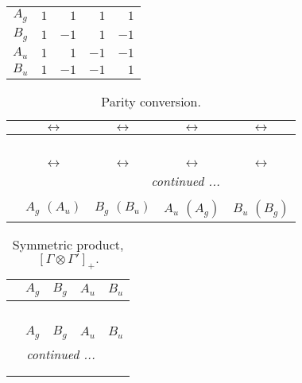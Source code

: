 \documentclass[fleqn,10pt,landscape]{article}
\begin{document}
\begin{itemize}
\begin{center}
\begin{longtable}{c|rrrr}
$ A_{g} $ & $ 1 $ & $ 1 $ & $ 1 $ & $ 1 $ \\
$ B_{g} $ & $ 1 $ & $ -1 $ & $ 1 $ & $ -1 $ \\
$ A_{u} $ & $ 1 $ & $ 1 $ & $ -1 $ & $ -1 $ \\
$ B_{u} $ & $ 1 $ & $ -1 $ & $ -1 $ & $ 1 $ \\
\end{longtable}
\end{center}
\begin{center}
\renewcommand{\arraystretch}{1.0}
\begin{longtable}{ccccc}
\caption{Parity conversion.}
 \\
 \hline \hline
 & $\leftrightarrow$ & $\leftrightarrow$ & $\leftrightarrow$ & $\leftrightarrow$ \\ \hline \endfirsthead

\multicolumn{4}{l}{\tablename\ \thetable{}} \\
 \hline \hline
 & $\leftrightarrow$ & $\leftrightarrow$ & $\leftrightarrow$ & $\leftrightarrow$ \\ \hline \endhead

 \hline \hline
\multicolumn{4}{r}{\footnotesize\it continued ...} \\ \endfoot

 \hline \hline
\multicolumn{4}{r}{} \\ \endlastfoot

 & $ A_{g}\,\,(A_{u}) $ & $ B_{g}\,\,(B_{u}) $ & $ A_{u}\,\,(A_{g}) $ & $ B_{u}\,\,(B_{g}) $ \\
\end{longtable}
\end{center}
\begin{center}
\renewcommand{\arraystretch}{1.0}
\begin{longtable}{c|cccc}
\caption{Symmetric product, $[\Gamma\otimes\Gamma']_+.$}
 \\
 \hline \hline
 & $ A_{g} $ & $ B_{g} $ & $ A_{u} $ & $ B_{u} $ \\ \hline \endfirsthead

\multicolumn{4}{l}{\tablename\ \thetable{}} \\
 \hline \hline
 & $ A_{g} $ & $ B_{g} $ & $ A_{u} $ & $ B_{u} $ \\ \hline \endhead

 \hline \hline
\multicolumn{4}{r}{\footnotesize\it continued ...} \\ \endfoot

 \hline \hline
\multicolumn{4}{r}{} \\ \endlastfoot


\end{longtable}
\end{center}
\end{itemize}
\end{document}
